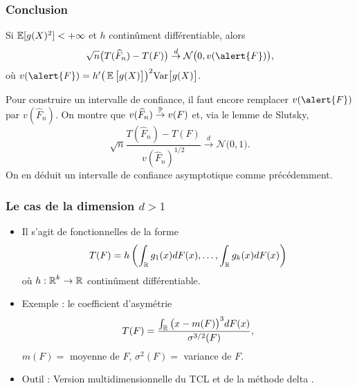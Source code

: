 \begin{frame}
\frametitle{Conclusion}
\begin{prop}
Si $\operatorname{{\mathbb E}}[g(X)^2]<+\infty$ et $h$ continûment différentiable, alors
$$\sqrt{n}\big(T(\widehat F_n)-T(F)\big)\stackrel{d}{\rightarrow} \gauss\big(0,v(\alert{F})\big),
$$
où $v(\alert{F}) = h'\big(\E\big[g(X)\big]\big)^2\mathrm{Var}\big[g(X)\big]$.
\end{prop}
Pour construire un \alert{intervalle de confiance}, il faut encore remplacer $v(\alert{F})$ par $v(\widehat F_n)$.
\alert{On montre que} $v(\widehat F_n)\stackrel{\operatorname{{\mathbb P}}}{\rightarrow} v(F)$ et, via le lemme de Slutsky,
$$
\sqrt{n}\frac{T(\widehat F_n)-T(F)}{v(\widehat F_n)^{1/2}}\stackrel{d}{\rightarrow} {\mathcal N}\big(0,1\big).
$$
On \alert{en déduit} un intervalle de confiance asymptotique comme précédemment.
\end{frame}
\begin{frame}
\frametitle{Le cas de la dimension $d>1$}
\begin{itemize}
\item Il s'agit de fonctionnelles de la forme
$$T(F) = h\left(\int_{\operatorname{{\mathbb R}}}g_1(x)dF(x),\ldots, \int_{\operatorname{{\mathbb R}}}g_k(x)dF(x)\right)$$
où $h:\operatorname{{\mathbb R}}^k\rightarrow \operatorname{{\mathbb R}}$ continûment différentiable.
\item \alert{Exemple} : le coefficient d'asymétrie
$$T(F) = \frac{\int_{\operatorname{{\mathbb R}}}\big(x-m(F)\big)^3dF(x)}{\sigma^{3/2}(F)},$$
$m(F)=$ moyenne de $F$, $\sigma^2(F) =$ variance de $F$.
\item \alert{Outil :} Version multidimensionnelle du TCL et de la \og méthode delta \fg{}.
\end{itemize}
\end{frame}

